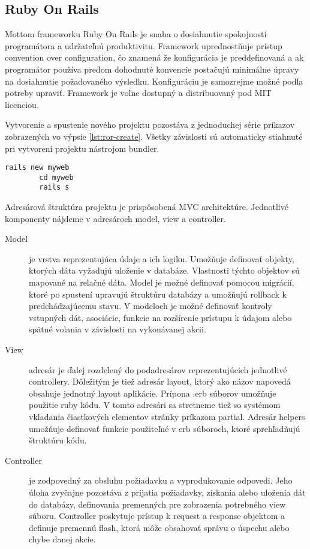 	\subsection{Ruby On Rails}
	Mottom frameworku Ruby On Rails je snaha o dosiahnutie spokojnosti programátora a udržateľnú produktivitu. Framework uprednostňuje prístup convention over configuration, čo znamená že konfigurácia je preddefinovaná a ak programátor používa predom dohodnuté konvencie postačujú minimálne úpravy na dosiahnutie požadovaného výsledku. Konfiguráciu je samozrejme možné podľa potreby upraviť. Framework je voľne dostupný a distribuovaný pod MIT licenciou.
	
	Vytvorenie a spustenie nového projektu pozostáva z jednoduchej série príkazov zobrazených vo výpsie \ref{lst:ror-create}. Všetky závislosti sú automaticky stiahnuté pri vytvorení projektu nástrojom bundler.
	\begin{lstlisting}[label=lst:ror-create,caption=Príklad vytvorenia a spustenia projektu v Ruby On Rails]
		rails new myweb
		cd myweb
		rails s
	\end{lstlisting}

	Adresárová štruktúra projektu je prispôsobená MVC architektúre. Jednotlivé komponenty nájdeme v adresároch model, view a controller.
	\begin{description}
		\item[Model] je vrstva reprezentujúca údaje a ich logiku. Umožňuje definovať objekty, ktorých dáta vyžadujú uloženie v databáze. Vlastnosti týchto objektov sú mapované na relačné dáta. Model je možné definovať pomocou migrácií, ktoré po spustení upravujú štruktúru databázy a umožňujú rollback k predchádzajúcemu stavu. V modeloch je možné definovať kontroly vstupných dát, asociácie, funkcie na rozšírenie prístupu k údajom alebo spätné volania v závislosti na vykonávanej akcii.
		\item[View] adresár je ďalej rozdelený do podadresárov reprezentujúcich jednotlivé controllery. Dôležitým je tiež adresár layout, ktorý ako názov napovedá obsahuje jednotný layout aplikácie. Prípona .erb súborov umožňuje použitie ruby kódu. V tomto adresári sa stretneme tiež so systémom vkladania čiastkových elementov stránky príkazom partial. Adresár helpers umožňuje definovať funkcie použiteľné v erb súboroch, ktoré sprehľadňujú štruktúru kódu.
		\item[Controller] je zodpovedný za obsluhu požiadavku a vyprodukovanie odpovedi. Jeho úloha zvyčajne pozostáva z prijatia požiadavky, získania alebo uloženia dát do databázy, definovania premenných pre zobrazenia potrebného view súboru. Controller poskytuje prístup k request a response objektom a definuje premennú flash, ktorá môže obsahovať správu o úspechu alebo chybe danej akcie.
	\end{description}
	
